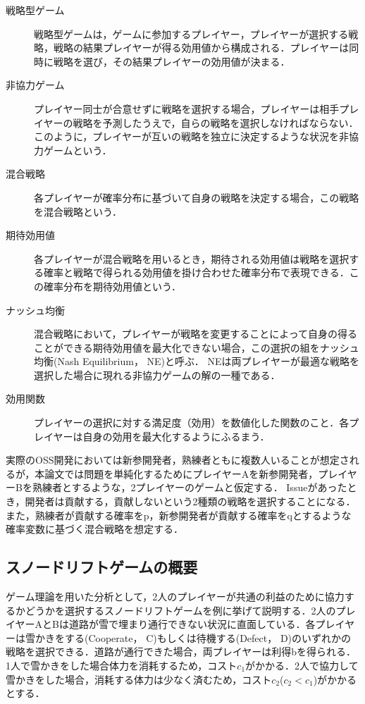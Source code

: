 \documentclass[11pt]{jreport}
\begin{document}
\begin{description}
\item[戦略型ゲーム] 戦略型ゲームは，ゲームに参加するプレイヤー，プレイヤーが選択する戦略，戦略の結果プレイヤーが得る効用値から構成される．プレイヤーは同時に戦略を選び，その結果プレイヤーの効用値が決まる．
\item[非協力ゲーム] プレイヤー同士が合意せずに戦略を選択する場合，プレイヤーは相手プレイヤーの戦略を予測したうえで，自らの戦略を選択しなければならない．このように，プレイヤーが互いの戦略を独立に決定するような状況を非協力ゲームという．
\item[混合戦略]各プレイヤーが確率分布に基づいて自身の戦略を決定する場合，この戦略を混合戦略という．
\item[期待効用値]各プレイヤーが混合戦略を用いるとき，期待される効用値は戦略を選択する確率と戦略で得られる効用値を掛け合わせた確率分布で表現できる．この確率分布を期待効用値という． 
\item[ナッシュ均衡]混合戦略において，プレイヤーが戦略を変更することによって自身の得ることができる期待効用値を最大化できない場合，この選択の組をナッシュ均衡(Nash Equilibrium， NE)と呼ぶ． NEは両プレイヤーが最適な戦略を選択した場合に現れる非協力ゲームの解の一種である．
\item[効用関数]プレイヤーの選択に対する満足度（効用）を数値化した関数のこと．各プレイヤーは自身の効用を最大化するようにふるまう． 
\end{description}


実際のOSS開発においては新参開発者，熟練者ともに複数人いることが想定されるが，本論文では問題を単純化するためにプレイヤーAを新参開発者，プレイヤーBを熟練者とするような，2プレイヤーのゲームと仮定する．
Issueがあったとき，開発者は貢献する，貢献しないという2種類の戦略を選択することになる．
また，熟練者が貢献する確率をp，新参開発者が貢献する確率をqとするような確率変数に基づく混合戦略を想定する．

\subsection{スノードリフトゲームの概要 }
ゲーム理論を用いた分析として，2人のプレイヤーが共通の利益のために協力するかどうかを選択するスノードリフトゲームを例に挙げて説明する．2人のプレイヤーAとBは道路が雪で埋まり通行できない状況に直面している．各プレイヤーは雪かきをする(Cooperate， C)もしくは待機する(Defect， D)のいずれかの戦略を選択できる．道路が通行できた場合，両プレイヤーは利得bを得られる．1人で雪かきをした場合体力を消耗するため，コスト$c_1$がかかる．2人で協力して雪かきをした場合，消耗する体力は少なく済むため，コスト$c_2$($c_2 < c_1$)がかかるとする．
\end{document}
